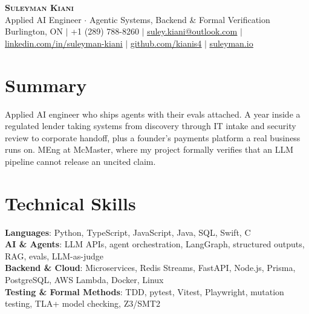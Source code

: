 \documentclass[letterpaper,11pt]{article}
\begin{document}
\begin{center}
    \textbf{\Huge \scshape Suleyman Kiani} \\ \vspace{3pt}
    \small Applied AI Engineer $\cdot$ Agentic Systems, Backend \& Formal Verification \\ \vspace{3pt}
    \footnotesize Burlington, ON $|$ +1 (289) 788-8260 $|$ \href{mailto:suley.kiani@outlook.com}{\underline{suley.kiani@outlook.com}} $|$ \href{https://www.linkedin.com/in/suleyman-kiani}{\underline{linkedin.com/in/suleyman-kiani}} $|$ \href{https://github.com/kianis4}{\underline{github.com/kianis4}} $|$ \href{https://suleyman.io}{\underline{suleyman.io}}
\end{center}

\section{Summary}
\vspace{2pt}
\small{Applied AI engineer who ships agents with their evals attached. A year inside a regulated lender taking systems from discovery through IT intake and security review to corporate handoff, plus a founder's payments platform a real business runs on. MEng at McMaster, where my project formally verifies that an LLM pipeline cannot release an uncited claim.}
\vspace{-4pt}

\section{Technical Skills}
\begin{itemize}[leftmargin=0.15in, label={}]
    \small{\item{
     \textbf{Languages}{: Python, TypeScript, JavaScript, Java, SQL, Swift, C} \\
     \textbf{AI \& Agents}{: LLM APIs, agent orchestration, LangGraph, structured outputs, RAG, evals, LLM-as-judge} \\
     \textbf{Backend \& Cloud}{: Microservices, Redis Streams, FastAPI, Node.js, Prisma, PostgreSQL, AWS Lambda, Docker, Linux} \\
     \textbf{Testing \& Formal Methods}{: TDD, pytest, Vitest, Playwright, mutation testing, TLA+ model checking, Z3/SMT2}
    }}
\end{itemize}
\end{document}
